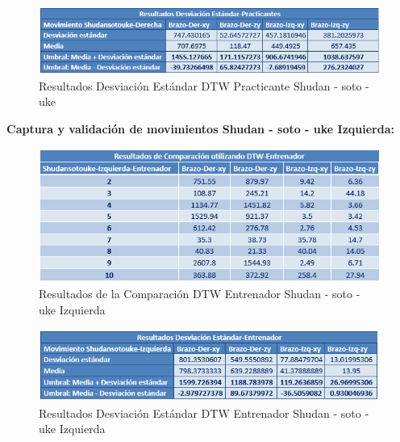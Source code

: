 \begin{figure}[H]%
	\begin{center}
		\includegraphics[scale=1]{./Figuras/Implementacion/Pruebas/Tablas/ResultadorDesvEstandar_Practicante_Shudansotouke}
	\end{center}
	\caption{Resultados Desviación Estándar DTW Practicante Shudan - soto - uke}
	\label{fig:ResultadorDesvEstandar_Practicante_Shudansotouke}
\end{figure}
\textbf{Captura y validación de movimientos Shudan - soto - uke Izquierda:}\\
\begin{figure}[H]%
	\begin{center}
		\includegraphics[scale=1]{./Figuras/Implementacion/Pruebas/Tablas/ResultadosDTW_Entrenador_Shudansotouke-Izquierdo}
	\end{center}
	\caption{Resultados de la Comparación DTW Entrenador Shudan - soto - uke Izquierda}
	\label{fig:ResultadosDTW_Entrenador_Shudansotouke-Izquierdo}
\end{figure}
\begin{figure}[H]%
	\begin{center}
		\includegraphics[scale=1]{./Figuras/Implementacion/Pruebas/Tablas/ResultadorDesvEstandar_Entrenador_Shudansotouke-Izquierdo}
	\end{center}
	\caption{Resultados Desviación Estándar DTW Entrenador Shudan - soto - uke Izquierda}
	\label{fig:ResultadorDesvEstandar_Entrenador_Shudansotouke-Izquierdo}
\end{figure}

